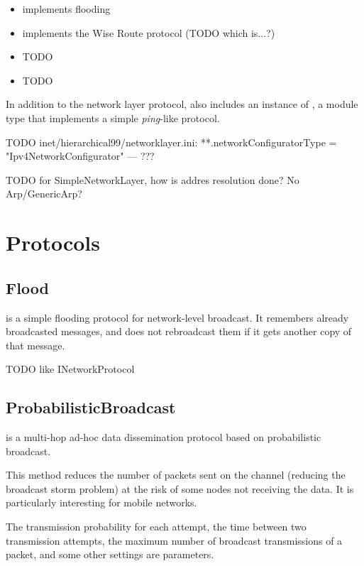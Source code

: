 \begin{itemize}
  \item {} implements flooding
  \item {} implements the Wise Route protocol (TODO which is...?)
  \item {} TODO
  \item {} TODO
\end{itemize}

In addition to the network layer protocol,  
also includes an instance of , a module type that
implements a simple \textit{ping}-like protocol.

TODO inet/hierarchical99/networklayer.ini:
**.networkConfiguratorType = "Ipv4NetworkConfigurator" --- ???

TODO for SimpleNetworkLayer, how is addres resolution done? No Arp/GenericArp?

\section{Protocols}

\subsection{Flood}

 is a simple flooding protocol for network-level broadcast.
It remembers already broadcasted messages, and does not rebroadcast 
them if it gets another copy of that message.

TODO like INetworkProtocol

\subsection{ProbabilisticBroadcast}

 is a multi-hop ad-hoc data dissemination 
protocol based on probabilistic broadcast.

This method reduces the number of packets sent on the channel (reducing the
broadcast storm problem) at the risk of some nodes not receiving the data.
It is particularly interesting for mobile networks.

The transmission probability for each attempt, the time between two transmission
attempts, the maximum number of broadcast transmissions of a packet, and
some other settings are parameters.

